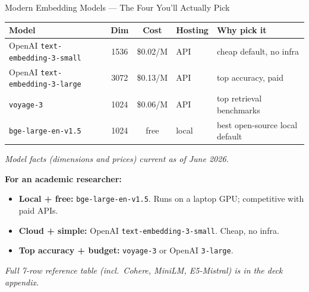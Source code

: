 \begin{frame}{Modern Embedding Models --- The Four You'll Actually Pick}
\begin{center}
\renewcommand{\arraystretch}{1.3}
\small
\begin{tabular}{|l|c|c|l|l|}
\hline
\textbf{Model} & \textbf{Dim} & \textbf{Cost} & \textbf{Hosting} & \textbf{Why pick it} \\
\hline
OpenAI \texttt{text-embedding-3-small} & 1536 & \$0.02/M & API & cheap default, no infra \\
\hline
OpenAI \texttt{text-embedding-3-large} & 3072 & \$0.13/M & API & top accuracy, paid \\
\hline
\texttt{voyage-3} & 1024 & \$0.06/M & API & top retrieval benchmarks \\
\hline
\texttt{bge-large-en-v1.5} & 1024 & free & local & best open-source local default \\
\hline
\end{tabular}
\end{center}

\smallskip
{\footnotesize\centering\textit{Model facts (dimensions and prices) current as of June 2026.}\par}

\bigskip
\textbf{For an academic researcher:}
\begin{itemize}
\item \textbf{Local + free:} \texttt{bge-large-en-v1.5}. Runs on a laptop GPU; competitive with paid APIs.
\item \textbf{Cloud + simple:} OpenAI \texttt{text-embedding-3-small}. Cheap, no infra.
\item \textbf{Top accuracy + budget:} \texttt{voyage-3} or OpenAI \texttt{3-large}.
\end{itemize}

\medskip
\footnotesize\textit{Full 7-row reference table (incl.\ Cohere, MiniLM, E5-Mistral) is in the deck appendix.}
\end{frame}

